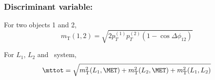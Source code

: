\begin{frame}
\frametitle{Discriminant variable: \mttot}

\vfill 

\begin{minipage}[c]{.6\textwidth}
\manip For two objects 1 and 2,
\begin{equation*}
m_{\mathrm{T}}(1,2) = \sqrt{2p_T^{(1)} p_T^{(2)} (1-\cos\Delta\phi_{12})}
\end{equation*}
\end{minipage}
\begin{minipage}[c]{.35\textwidth}
\begin{center}
\end{center}
\end{minipage}

\vfill \pause

\manip For $L_1$, $L_2$ and \MET\ system,
\begin{equation*}
\mttot = \sqrt{m_{\mathrm{T}}^2(L_1,\MET) + m_{\mathrm{T}}^2(L_2,\MET) + m_{\mathrm{T}}^2(L_1,L_2)}
\end{equation*}

\vfill 

\end{frame}